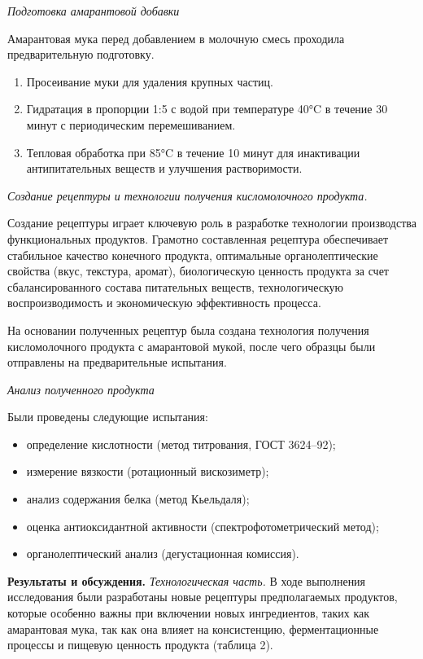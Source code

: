 {\emph{Подготовка амарантовой добавки}

Амарантовая мука перед добавлением в молочную смесь проходила
предварительную подготовку.

\begin{enumerate}
\def\labelenumi{\arabic{enumi}.}
\item
  Просеивание муки для удаления крупных частиц.
\item
  Гидратация в пропорции 1:5 с водой при температуре 40°C в течение 30
  минут с периодическим перемешиванием.
\item
  Тепловая обработка при 85°C в течение 10 минут для инактивации
  антипитательных веществ и улучшения растворимости.
\end{enumerate}

\emph{Создание рецептуры и технологии получения кисломолочного
продукта.}

Создание рецептуры играет ключевую роль в разработке технологии
производства функциональных продуктов. Грамотно составленная рецептура
обеспечивает стабильное качество конечного продукта, оптимальные
органолептические свойства (вкус, текстура, аромат), биологическую
ценность продукта за счет сбалансированного состава питательных веществ,
технологическую воспроизводимость и экономическую эффективность
процесса.

На основании полученных рецептур была создана технология получения
кисломолочного продукта с амарантовой мукой, после чего образцы были
отправлены на предварительные испытания.

\emph{Анализ полученного продукта}

Были проведены следующие испытания:

\begin{itemize}
\item
  определение кислотности (метод титрования, ГОСТ 3624--92);
\item
  измерение вязкости (ротационный вискозиметр);
\item
  анализ содержания белка (метод Кьельдаля);
\item
  оценка антиоксидантной активности (спектрофотометрический метод);
\item
  органолептический анализ (дегустационная комиссия).
\end{itemize}

{\bfseries Результаты и обсуждения.} \emph{Технологическая часть.} В ходе
выполнения исследования были разработаны новые рецептуры предполагаемых
продуктов, которые особенно важны при включении новых ингредиентов,
таких как амарантовая мука, так как она влияет на консистенцию,
ферментационные процессы и пищевую ценность продукта (таблица 2).

}
